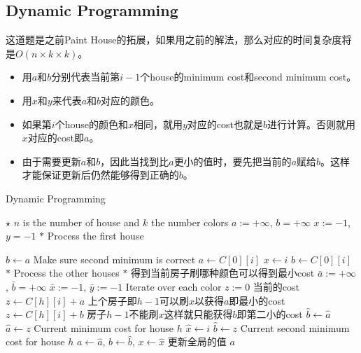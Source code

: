 \subsection{Dynamic Programming}
这道题是之前Paint House的拓展，如果用之前的解法，那么对应的时间复杂度将是$O(n\times k\times k)$。
\begin{itemize}
\item 用$a$和$b$分别代表当前第$i-1$个house的minimum cost和second minimum cost。
\item 用$x$和$y$来代表$a$和$b$对应的颜色。
\item 如果第$i$个house的颜色和$x$相同，就用$y$对应的cost也就是$b$进行计算。否则就用$x$对应的cost即$a$。
\item 由于需要更新$a$和$b$，因此当找到比$a$更小的值时，要先把当前的$a$赋给$b$。这样才能保证更新后仍然能够得到正确的$b$。
\end{itemize}
\setcounter{algorithm}{0}
\begin{algorithm}[H]
\caption{Dynamic Programming}
\begin{algorithmic}[1]
\State $\star$ $n$ is the number of house and $k$ the number colors
\State $a:=+\infty$, $b=+\infty$
\State $x:=-1$, $y=-1$
\State $\ast$ Process the first house
\end{algorithmic}
\end{algorithm}
\begin{algorithm}[H]
\begin{algorithmic}[1]
\State $b\gets a$ \Comment Make sure second minimum is correct
\State $a\gets C[0][i]$
\State $x\gets i$
\State $b\gets C[0][i]$
\EndIf
\EndFor
\State $\ast$ Process the other houses
\State $\ast$ 得到当前房子刷哪种颜色可以得到最小cost
\State $\bar{a}:=+\infty$, $\bar{b}=+\infty$
\State $\bar{x}:=-1$, $\bar{y}:=-1$
 \Comment Iterate over each color
\State $z:=0$ \Comment 当前的cost
\State $z\gets C[h][i] + a$ \Comment 上个房子即$h-1$可以刷$x$以获得$a$即最小的cost
\Else
\State $z\gets C[h][i] + b$ \Comment 房子$h-1$不能刷$x$这样就只能获得$b$即第二小的cost
\EndIf
{}
\State $\hat{b}\gets\hat{a}$
\State $\hat{a}\gets z$ \Comment Current minimum cost for house $h$
\State $\hat{x}\gets i$
\State $\hat{b}\gets z$ \Comment Current second minimum cost for house $h$
\EndIf
\EndFor
\State $a\gets\hat{a}$, $b\gets\hat{b}$, $x\gets\hat{x}$ \Comment 更新全局的值
\EndFor
\State \Return $a$
\EndProcedure
\end{algorithmic}
\end{algorithm}
